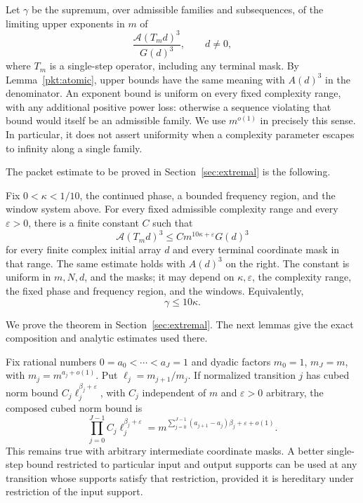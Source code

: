 Let $\gamma$ be the supremum, over admissible families and subsequences,
of the limiting upper exponents in $m$ of
\begin{equation}\label{eq:source-31}
 \frac{\mathcal A(T_m d)^3}{G(d)^3},\qquad d\ne0,
\end{equation}
where $T_m$ is a single-step operator, including any terminal mask.
By Lemma~\ref{pkt:atomic}, upper bounds have the same meaning with
$A(d)^3$ in the denominator.  An exponent bound is uniform on every
fixed complexity range, with any additional positive power loss:
otherwise a sequence violating that bound would itself be an
admissible family.  We use $m^{o(1)}$ in precisely this sense.  In
particular, it does not assert uniformity when a complexity parameter
escapes to infinity along a single family.

The packet estimate to be proved in Section~\ref{sec:extremal} is the
following.

\begin{theorem}\label{pkt:main}
Fix \(0<\kappa<1/10\), the continued phase, a bounded frequency region,
and the window system above.  For every fixed admissible complexity
range and every \(\varepsilon>0\), there is a finite constant \(C\) such
that
\begin{equation}\label{pkt:uniform-main}
 \mathcal A(T_m d)^3
   \le C m^{10\kappa+\varepsilon}G(d)^3
\end{equation}
for every finite complex initial array \(d\) and every terminal
coordinate mask in that range.  The same estimate holds with \(A(d)^3\)
on the right.  The constant is uniform in \(m,N,d\), and the masks; it
may depend on \(\kappa,\varepsilon\), the complexity range, the fixed
phase and frequency region, and the windows.  Equivalently,
\begin{equation}\label{eq:source-32}
 \gamma\le10\kappa.
\end{equation}
\end{theorem}

We prove the theorem in Section~\ref{sec:extremal}.  The next lemmas
give the exact composition and analytic estimates used there.

\begin{lemma}[Composition]\label{pkt:composition}
Fix rational numbers $0=a_0<\cdots<a_J=1$ and dyadic factors
$m_0=1$, $m_J=m$, with $m_j=m^{a_j+o(1)}$.  Put
$\ell_j=m_{j+1}/m_j$.  If normalized transition $j$ has cubed norm
bound $C_j\ell_j^{\beta_j+\varepsilon}$, with $C_j$ independent of
$m$ and $\varepsilon>0$ arbitrary, the composed cubed norm bound is
\[
 \prod_{j=0}^{J-1}C_j\ell_j^{\beta_j+\varepsilon}
   =m^{\sum_{j=0}^{J-1}(a_{j+1}-a_j)\beta_j
          +\varepsilon+o(1)}.
\]
This remains true with arbitrary intermediate coordinate masks.
A better single-step bound restricted to particular input and output
supports can be used at any transition whose supports satisfy that
restriction, provided it is hereditary under restriction of the input
support.
\end{lemma}

